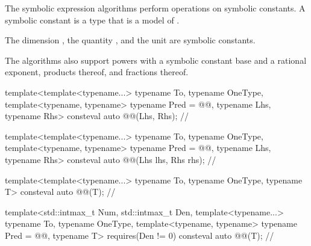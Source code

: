 \pnum
The symbolic expression algorithms perform operations on symbolic constants.
A symbolic constant is a type that is a model of .
\begin{example}
The dimension , the quantity , and the unit  are symbolic constants.
\end{example}
The algorithms also support
powers with a symbolic constant base and a rational exponent,
products thereof, and
fractions thereof.

\begin{itemdecl}
template<template<typename...> typename To, typename OneType,
         template<typename, typename> typename Pred = @@, typename Lhs, typename Rhs>
consteval auto @@(Lhs, Rhs);        // \expos

template<template<typename...> typename To, typename OneType,
         template<typename, typename> typename Pred = @@, typename Lhs, typename Rhs>
consteval auto @@(Lhs lhs, Rhs rhs);  // \expos

template<template<typename...> typename To, typename OneType, typename T>
consteval auto @@(T);                 // \expos

template<std::intmax_t Num, std::intmax_t Den, template<typename...> typename To,
         typename OneType, template<typename, typename> typename Pred = @@, typename T>
  requires(Den != 0)
consteval auto @@(T);                    // \expos
\end{itemdecl}

